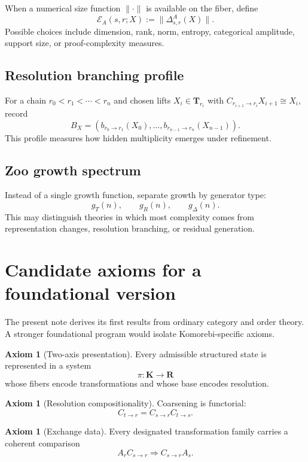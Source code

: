 \documentclass[11pt]{article}
\theoremstyle{definition}
\newtheorem{axiom}[theorem]{Axiom}
\theoremstyle{remark}
\newcommand{\K}{\mathbf K}
\newcommand{\Rcat}{\mathbf R}
\newcommand{\Tcat}{\mathbf T}
\begin{document}
When a numerical size function $\|\cdot\|$ is available on the fiber, define
\[
\mathcal E_A(s,r;X):=\|\Delta^A_{s,r}(X)\|.
\]
Possible choices include dimension, rank, norm, entropy, categorical amplitude, support size, or proof-complexity measures.

\subsection{Resolution branching profile}

For a chain $r_0<r_1<\cdots<r_n$ and chosen lifts $X_i\in\Tcat_{r_i}$ with $C_{r_{i+1}\to r_i}X_{i+1}\cong X_i$, record
\[
B_X=(b_{r_0\to r_1}(X_0),\ldots,b_{r_{n-1}\to r_n}(X_{n-1})).
\]
This profile measures how hidden multiplicity emerges under refinement.

\subsection{Zoo growth spectrum}

Instead of a single growth function, separate growth by generator type:
\[
g_T(n),\qquad g_R(n),\qquad g_\Delta(n).
\]
This may distinguish theories in which most complexity comes from representation changes, resolution branching, or residual generation.

\section{Candidate axioms for a foundational version}

The present note derives its first results from ordinary category and order theory. A stronger foundational program would isolate Komorebi-specific axioms.

\begin{axiom}[Two-axis presentation]
Every admissible structured state is represented in a system
\[
\pi:\K\to\Rcat
\]
whose fibers encode transformations and whose base encodes resolution.
\end{axiom}

\begin{axiom}[Resolution compositionality]
Coarsening is functorial:
\[
C_{t\to r}=C_{s\to r}C_{t\to s}.
\]
\end{axiom}

\begin{axiom}[Exchange data]
Every designated transformation family carries a coherent comparison
\[
A_rC_{s\to r}\Longrightarrow C_{s\to r}A_s.
\]
\end{axiom}
\end{document}
